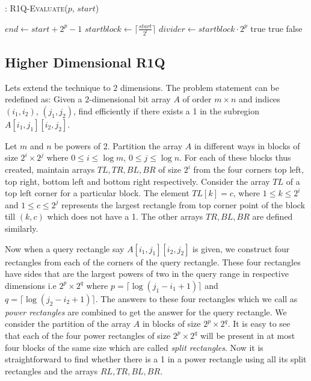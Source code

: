 \documentclass{article}
\begin{document}
\begin{algorithm}
\begin{algorithmic}[1]
\caption{: \textsc{R1Q-Evaluate}($p$, $start$)}
\label{r1qtlrevaluate}
\medskip
\STATE $end \gets start + 2^p - 1$
\STATE $startblock \gets \lceil \frac{start}{2^l} \rceil$
\STATE $divider \gets startblock \cdot 2^p$
\medskip
{}
		\RETURN true
	\ENDIF
\ELSE
		\RETURN true
	\ENDIF
\ENDIF
\medskip
\RETURN false
\medskip
\end{algorithmic}
\end{algorithm}

\subsection{Higher Dimensional R1Q}
Lets extend the technique to 2 dimensions. The problem statement can be redefined as: Given a $2$-dimensional bit array $A$ of order $m \times n$ and indices $(i_1,i_2)$, $(j_1,j_2)$, find efficiently if there exists a 1 in the subregion $A[i_1, j_1][i_2, j_2]$.

Let $m$ and $n$ be powers of 2. Partition the array $A$ in different ways in blocks of size $2^i \times 2^j$ where $0 \le i \le \log m $, $0 \le j \le \log n$. For each of these blocks thus created, maintain arrays $TL, TR, BL, BR$ of size $2^i$ from the four corners top left, top right, bottom left and bottom right respectively. Consider the array $TL$ of a top left corner for a particular block. The element $TL[k] = c$, where $1 \le k \le 2^i$ and $1 \le c \le 2^j$ represents the largest rectangle from top corner point of the block till $(k, c)$ which does not have a 1. The other arrays $TR, BL, BR$ are defined similarly.

Now when a query rectangle say $A[i_1, j_1][i_2, j_2]$ is given, we construct four rectangles from each of the corners of the query rectangle. These four rectangles have sides that are the largest powers of two in the query range in respective dimensions i.e $2^p \times 2^q$ where $p = \lceil \log (j_1 - i_1 + 1) \rceil$ and $q =\lceil \log (j_2 - i_2 + 1) \rceil $. The answers to these four rectangles which we call as \textit{power rectangles} are combined to get the answer for the query rectangle. We consider the partition of the array $A$ in blocks of size $2^p \times 2^q$. It is easy to see that each of the four power rectangles of size $2^p \times 2^q$ will be present in at most four blocks of the same size which are called \textit{split rectangles}. Now it is straightforward to find whether there is a 1 in a power rectangle using all its split rectangles and the arrays $RL, TR, BL, BR$.
\end{document}
